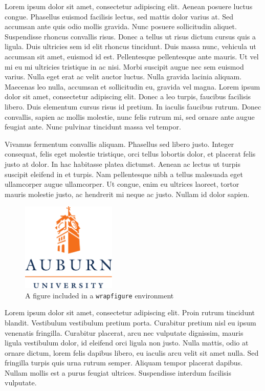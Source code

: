\documentclass{article}
\begin{document}
Lorem ipsum dolor sit amet, consectetur adipiscing elit. Aenean posuere luctus congue. Phasellus euismod facilisis lectus, sed mattis dolor varius at. Sed accumsan ante quis odio mollis gravida. Nunc posuere sollicitudin aliquet. Suspendisse rhoncus convallis risus. Donec a tellus ut risus dictum cursus quis a ligula. Duis ultricies sem id elit rhoncus tincidunt. Duis massa nunc, vehicula ut accumsan sit amet, euismod id est. Pellentesque pellentesque ante mauris. Ut vel mi eu mi ultricies tristique in ac nisi. Morbi suscipit augue nec sem euismod varius. Nulla eget erat ac velit auctor luctus. Nulla gravida lacinia aliquam. Maecenas leo nulla, accumsan et sollicitudin eu, gravida vel magna. Lorem ipsum dolor sit amet, consectetur adipiscing elit. Donec a leo turpis, faucibus facilisis libero. Duis elementum cursus risus id pretium. In iaculis faucibus rutrum. Donec convallis, sapien ac mollis molestie, nunc felis rutrum mi, sed ornare ante augue feugiat ante. Nunc pulvinar tincidunt massa vel tempor.


Vivamus fermentum convallis aliquam. Phasellus sed libero justo. Integer consequat, felis eget molestie tristique, orci tellus lobortis dolor, et placerat felis justo at dolor. In hac habitasse platea dictumst. Aenean ac lectus ut turpis suscipit eleifend in et turpis. Nam pellentesque nibh a tellus malesuada eget ullamcorper augue ullamcorper. Ut congue, enim eu ultrices laoreet, tortor mauris molestie justo, ac hendrerit mi neque ac justo. Nullam id dolor sapien. 
\begin{figure}
  \centering
  \includegraphics[width=0.4\textwidth]{aulogo.pdf}
  \caption{A figure included in a \texttt{wrapfigure} environment}
\end{figure}

Lorem ipsum dolor sit amet, consectetur adipiscing elit. Proin rutrum tincidunt blandit. Vestibulum vestibulum pretium porta. Curabitur pretium nisl eu ipsum venenatis fringilla. Curabitur placerat, arcu nec vulputate dignissim, mauris ligula vestibulum dolor, id eleifend orci ligula non justo. Nulla mattis, odio at ornare dictum, lorem felis dapibus libero, eu iaculis arcu velit sit amet nulla. Sed fringilla turpis quis urna rutrum semper. Aliquam tempor placerat dapibus. Nullam mollis est a purus feugiat ultrices. Suspendisse interdum facilisis vulputate.
\end{document}
